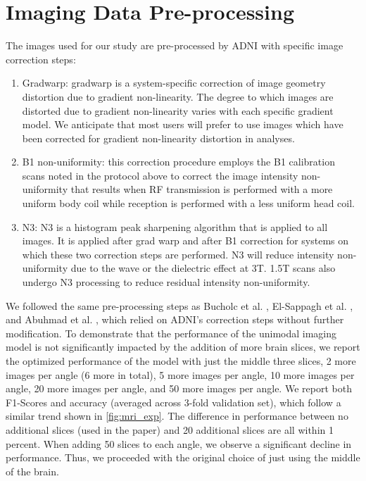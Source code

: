 \section{Imaging Data Pre-processing}
\label{section:img_preproc}
The images used for our study are pre-processed by ADNI with specific image correction steps:
\begin{enumerate}
\item Gradwarp: gradwarp is a system-specific correction of image geometry distortion due to gradient non-linearity. The degree to which images are distorted due to gradient non-linearity varies with each specific gradient model. We anticipate that most users will prefer to use images which have been corrected for gradient non-linearity distortion in analyses.
\item B1 non-uniformity: this correction procedure employs the B1 calibration scans noted in the protocol above to correct the image intensity non-uniformity that results when RF transmission is performed with a more uniform body coil while reception is performed with a less uniform head coil.
\item N3: N3 is a histogram peak sharpening algorithm that is applied to all images. It is applied after grad warp and after B1 correction for systems on which these two correction steps are performed. N3 will reduce intensity non-uniformity due to the wave or the dielectric effect at 3T. 1.5T scans also undergo N3 processing to reduce residual intensity non-uniformity.
\end{enumerate}
We followed the same pre-processing steps as Bucholc et al. \cite{BUCHOLC2019157}, El-Sappagh et al. \cite{ELSAPPAGH2020197}, and Abuhmad et al. \cite{ABUHMED2021106688}, which relied on ADNI’s correction steps without further modification.
\newline 
To demonstrate that the performance of the unimodal imaging model is not significantly impacted by the addition of more brain slices, we report the optimized performance of the model with just the middle three slices, 2 more images per angle (6 more in total), 5 more images per angle, 10 more images per angle, 20 more images per angle, and 50 more images per angle. We report both F1-Scores and accuracy (averaged across 3-fold validation set), which follow a similar trend shown in \ref{fig:mri_exp}. The difference in performance between no additional slices (used in the paper) and 20 additional slices are all within 1 percent. When adding 50 slices to each angle, we observe a significant decline in performance. Thus, we proceeded with the original choice of just using the middle of the brain.  

